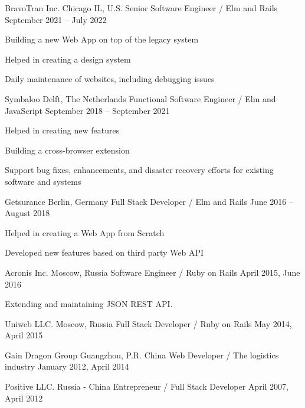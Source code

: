 \documentclass[11pt]{resume}
\begin{document}
\makecvheader[C]

\begin{cventries}

\end{cventries}


\begin{cventries}

\cventry
  {BravoTran Inc.}
  {Chicago IL, U.S.}
  {Senior Software Engineer / Elm and Rails}
  {September 2021 – July 2022}
  {
    \begin{cvitems}
    \item { Building a new Web App on top of the legacy system}
    \item { Helped in creating a design system }
    \item { Daily maintenance of websites, including debugging issues }
    \end{cvitems}
  }

\cventry
  {Symbaloo}
  {Delft, The Netherlands}
  {Functional Software Engineer / Elm and JavaScript}
  {September 2018 – September 2021}
  {
    \begin{cvitems}
    \item { Helped in creating new features }
    \item { Building a cross-browser extension }
    \item { Support bug fixes, enhancements, and disaster recovery 
    efforts for existing software and systems }
    \end{cvitems}
  }

\cventry
    {Getsurance}
    {Berlin, Germany}
    {Full Stack Developer / Elm and Rails}
    {June 2016 – August 2018} {
    \begin{cvitems}
    \item { Helped in creating a Web App from Scratch }
    \item { Developed new features based on third party Web API  }
    \end{cvitems}
  }

\cventry
  {Acronis Inc.}
  {Moscow, Russia}
  {Software Engineer / Ruby on Rails}
  {April 2015, June 2016}
  {
    \begin{cvitems}
    \item { Extending and maintaining JSON REST API. }
    \end{cvitems}
  }

\cventry
  {Uniweb LLC.}
  {Moscow, Russia}
  {Full Stack Developer / Ruby on Rails}
  {May 2014, April 2015}
  {}

\cventry
  {Gain Dragon Group}
  {Guangzhou, P.R. China}
  {Web Developer / The logistics industry }
  {January 2012, April 2014}
  {}

\cventry
  {Positive LLC.}
  {Russia - China}
  {Entrepreneur / Full Stack Developer}
  {April 2007, April 2012}
  {}

\end{cventries}
\end{document}
